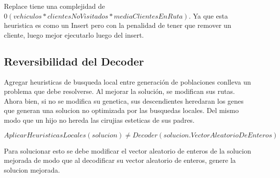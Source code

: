 \bigskip

Replace tiene una complejidad de $0(vehiculos * clientesNoVisitados * mediaClientesEnRuta)$. Ya que esta heuristica es como un Insert pero con la penalidad de tener que remover un cliente, luego mejor ejecutarlo luego del insert.

\subsection{Reversibilidad del Decoder}

Agregar heuristicas de busqueda local entre generación de poblaciones conlleva un problema que debe resolverse. Al mejorar la solución, se modifican sus rutas. Ahora bien, si no se modifica su genetica, sus descendientes heredaran los genes que generan una solucion no optimizada por las busquedas locales. Del mismo modo que un hijo no hereda las cirujias esteticas de sus padres. 

\begin{equation*}
AplicarHeuristicasLocales(solucion) \neq Decoder(solucion.VectorAleatorioDeEnteros)
\end{equation*}

Para solucionar esto se debe modificar el vector aleatorio de enteros de la solucion mejorada de modo que al decodificar su vector aleatorio de enteros, genere la solucion mejorada.
